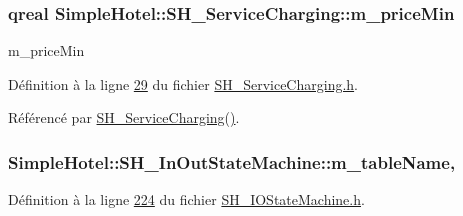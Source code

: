 \hypertarget{classSimpleHotel_1_1SH__ServiceCharging_a72f1c4a2c5ae6344b9e8a8dbd85f1029}{
\subsubsection[{m\-\_\-price\-Min}]{\setlength{\rightskip}{0pt plus 5cm}qreal Simple\-Hotel\-::\-S\-H\-\_\-\-Service\-Charging\-::m\-\_\-price\-Min\hspace{0.3cm}{\ttfamily [private]}}}\label{classSimpleHotel_1_1SH__ServiceCharging_a72f1c4a2c5ae6344b9e8a8dbd85f1029}


m\-\_\-price\-Min 



Définition à la ligne \hyperlink{SH__ServiceCharging_8h_source_l00029}{29} du fichier \hyperlink{SH__ServiceCharging_8h_source}{S\-H\-\_\-\-Service\-Charging.\-h}.



Référencé par \hyperlink{classSimpleHotel_1_1SH__ServiceCharging_ae82c86c7e955f0dc93cdfc3603789b87}{S\-H\-\_\-\-Service\-Charging()}.

\hypertarget{classSimpleHotel_1_1SH__InOutStateMachine_a15c063debdaa4c87bd4925867a13ce9e}{
\subsubsection[{m\-\_\-table\-Name}]{\setlength{\rightskip}{0pt plus 5cm}Simple\-Hotel\-::\-S\-H\-\_\-\-In\-Out\-State\-Machine\-::m\-\_\-table\-Name\hspace{0.3cm}{\ttfamily [protected]}, {\ttfamily [inherited]}}}\label{classSimpleHotel_1_1SH__InOutStateMachine_a15c063debdaa4c87bd4925867a13ce9e}


Définition à la ligne \hyperlink{SH__IOStateMachine_8h_source_l00224}{224} du fichier \hyperlink{SH__IOStateMachine_8h_source}{S\-H\-\_\-\-I\-O\-State\-Machine.\-h}.



